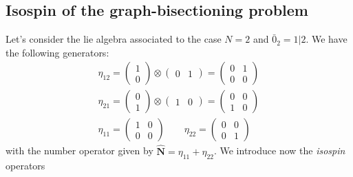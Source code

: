 \documentclass[twocolumn,aps,sort,nofootinbib]{revtex4}
\begin{document}
\subsection{Isospin of the graph-bisectioning problem}
Let's consider the lie algebra associated to the
case $N=2$ and ${\bar 0}_2=1|2$. We have the following 
generators:
\begin{subequations}
\begin{align}
\eta_{12}=
\begin{pmatrix}
1 \\ 0
\end{pmatrix} \otimes
\begin{pmatrix}
0 & 1
\end{pmatrix}
=
\begin{pmatrix}
0 & 1 \\
0 & 0
\end{pmatrix}
\\
\eta_{21}=
\begin{pmatrix}
0 \\ 1
\end{pmatrix} \otimes
\begin{pmatrix}
1 & 0
\end{pmatrix}
=
\begin{pmatrix}
0 & 0 \\
1 & 0
\end{pmatrix}
\\
\eta_{11}=
\begin{pmatrix}
1 & 0 \\
0 & 0 
\end{pmatrix}
\quad\quad
\eta_{22}=
\begin{pmatrix}
0 &0 \\
0 &1
\end{pmatrix}
\end{align}
\end{subequations}
with the number operator given by $\boldsymbol{\hat{N}}=\eta_{11}+\eta_{22}$.
We introduce now the {\em isospin} operators
\end{document}

